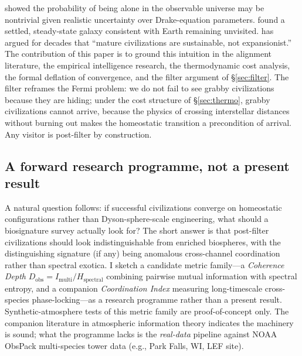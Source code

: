 \documentclass[11pt,a4paper,twocolumn]{article}
\begin{document}
\citet{sandberg2018} showed the probability of being alone in the
observable universe may be nontrivial given realistic uncertainty over
Drake-equation parameters. \citet{carroll2019} found a settled,
steady-state galaxy consistent with Earth remaining unvisited.
\citet{cirkovic2018} has argued for decades that ``mature civilizations
are sustainable, not expansionist.'' The contribution of this paper
is to ground this intuition in the alignment literature, the empirical
intelligence research, the thermodynamic cost analysis, the formal
deflation of convergence, and the filter argument of \S\ref{sec:filter}.
The filter reframes the Fermi problem: we do not fail to see
grabby civilizations because they are hiding; under the cost structure
of \S\ref{sec:thermo}, grabby civilizations cannot arrive, because the
physics of crossing interstellar distances without burning out makes
the homeostatic transition a precondition of arrival. Any visitor is
post-filter by construction.

\subsection{A forward research programme, not a present result}

A natural question follows: if successful civilizations converge on
homeostatic configurations rather than Dyson-sphere-scale engineering,
what should a biosignature survey actually look for? The short answer
is that post-filter civilizations should look indistinguishable from
enriched biospheres, with the distinguishing signature (if any) being
anomalous cross-channel coordination rather than spectral exotica. I
sketch a candidate metric family---a \emph{Coherence Depth}
$D_\mathrm{obs} = I_\mathrm{multi} / H_\mathrm{spectral}$ combining
pairwise mutual information \citep{kraskov2004} with spectral entropy,
and a companion \emph{Coordination Index} measuring long-timescale
cross-species phase-locking---as a research programme rather than a
present result. Synthetic-atmosphere tests of this metric family
\citep[separation between Earth-like, managed, abiotic, and Mars-like
baselines;][]{kraskov2004,donges2009,hyvonen2018,campuzano2018} are
proof-of-concept only. The companion literature in atmospheric
information theory \citep{donges2009,hyvonen2018,campuzano2018,runge2015,ebertuphoff2012}
indicates the machinery is sound; what the programme lacks is the
\emph{real-data} pipeline against NOAA ObsPack multi-species tower
data (e.g., Park Falls, WI, LEF site).
\end{document}
